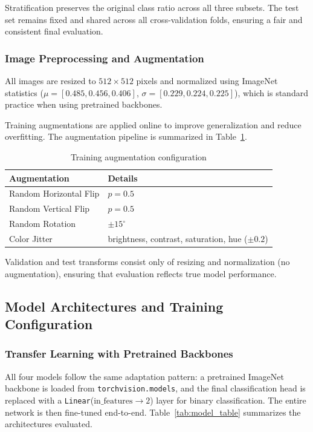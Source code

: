 \documentclass[conference]{IEEEtran}
\begin{document}
Stratification preserves the original class ratio across all three subsets. The test set
remains fixed and shared across all cross-validation folds, ensuring a fair and consistent
final evaluation.

\subsubsection{Image Preprocessing and Augmentation}

\medskip
All images are resized to $512 \times 512$ pixels and normalized using ImageNet statistics
($\mu = [0.485, 0.456, 0.406]$, $\sigma = [0.229, 0.224, 0.225]$), which is standard practice
when using pretrained backbones.

Training augmentations are applied online to improve generalization and reduce overfitting. The
augmentation pipeline is summarized in Table~\ref{tab:aug_table}.

\begin{table}[t]
  \caption{Training augmentation configuration}
  \label{tab:aug_table}
  \centering
  \begin{tabular}{ll}
    \toprule
    \textbf{Augmentation} & \textbf{Details} \\
    \midrule
    Random Horizontal Flip & $p = 0.5$ \\
    Random Vertical Flip   & $p = 0.5$ \\
    Random Rotation        & $\pm 15^{\circ}$ \\
    Color Jitter           & brightness, contrast, saturation, hue ($\pm 0.2$) \\
    \bottomrule
  \end{tabular}
\end{table}

Validation and test transforms consist only of resizing and normalization (no augmentation),
ensuring that evaluation reflects true model performance.

\subsection{Model Architectures and Training Configuration}

\medskip
\subsubsection{Transfer Learning with Pretrained Backbones}

\medskip
All four models follow the same adaptation pattern: a pretrained ImageNet backbone is loaded
from \texttt{torchvision.models}, and the final classification head is replaced with a
\texttt{Linear}($\text{in\_features} \rightarrow 2$) layer for binary classification. The
entire network is then fine-tuned end-to-end. Table~\ref{tab:model_table} summarizes the
architectures evaluated.
\end{document}
